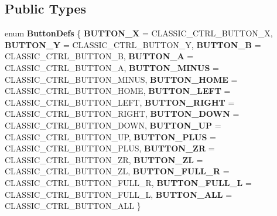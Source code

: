 \subsection*{\-Public \-Types}
\begin{DoxyCompactItemize}
\item 
enum {\bfseries \-Button\-Defs} \{ \*
{\bfseries \-B\-U\-T\-T\-O\-N\-\_\-\-X} =  \-C\-L\-A\-S\-S\-I\-C\-\_\-\-C\-T\-R\-L\-\_\-\-B\-U\-T\-T\-O\-N\-\_\-\-X, 
{\bfseries \-B\-U\-T\-T\-O\-N\-\_\-\-Y} =  \-C\-L\-A\-S\-S\-I\-C\-\_\-\-C\-T\-R\-L\-\_\-\-B\-U\-T\-T\-O\-N\-\_\-\-Y, 
{\bfseries \-B\-U\-T\-T\-O\-N\-\_\-\-B} =  \-C\-L\-A\-S\-S\-I\-C\-\_\-\-C\-T\-R\-L\-\_\-\-B\-U\-T\-T\-O\-N\-\_\-\-B, 
{\bfseries \-B\-U\-T\-T\-O\-N\-\_\-\-A} =  \-C\-L\-A\-S\-S\-I\-C\-\_\-\-C\-T\-R\-L\-\_\-\-B\-U\-T\-T\-O\-N\-\_\-\-A, 
\*
{\bfseries \-B\-U\-T\-T\-O\-N\-\_\-\-M\-I\-N\-U\-S} =  \-C\-L\-A\-S\-S\-I\-C\-\_\-\-C\-T\-R\-L\-\_\-\-B\-U\-T\-T\-O\-N\-\_\-\-M\-I\-N\-U\-S, 
{\bfseries \-B\-U\-T\-T\-O\-N\-\_\-\-H\-O\-M\-E} =  \-C\-L\-A\-S\-S\-I\-C\-\_\-\-C\-T\-R\-L\-\_\-\-B\-U\-T\-T\-O\-N\-\_\-\-H\-O\-M\-E, 
{\bfseries \-B\-U\-T\-T\-O\-N\-\_\-\-L\-E\-F\-T} =  \-C\-L\-A\-S\-S\-I\-C\-\_\-\-C\-T\-R\-L\-\_\-\-B\-U\-T\-T\-O\-N\-\_\-\-L\-E\-F\-T, 
{\bfseries \-B\-U\-T\-T\-O\-N\-\_\-\-R\-I\-G\-H\-T} =  \-C\-L\-A\-S\-S\-I\-C\-\_\-\-C\-T\-R\-L\-\_\-\-B\-U\-T\-T\-O\-N\-\_\-\-R\-I\-G\-H\-T, 
\*
{\bfseries \-B\-U\-T\-T\-O\-N\-\_\-\-D\-O\-W\-N} =  \-C\-L\-A\-S\-S\-I\-C\-\_\-\-C\-T\-R\-L\-\_\-\-B\-U\-T\-T\-O\-N\-\_\-\-D\-O\-W\-N, 
{\bfseries \-B\-U\-T\-T\-O\-N\-\_\-\-U\-P} =  \-C\-L\-A\-S\-S\-I\-C\-\_\-\-C\-T\-R\-L\-\_\-\-B\-U\-T\-T\-O\-N\-\_\-\-U\-P, 
{\bfseries \-B\-U\-T\-T\-O\-N\-\_\-\-P\-L\-U\-S} =  \-C\-L\-A\-S\-S\-I\-C\-\_\-\-C\-T\-R\-L\-\_\-\-B\-U\-T\-T\-O\-N\-\_\-\-P\-L\-U\-S, 
{\bfseries \-B\-U\-T\-T\-O\-N\-\_\-\-Z\-R} =  \-C\-L\-A\-S\-S\-I\-C\-\_\-\-C\-T\-R\-L\-\_\-\-B\-U\-T\-T\-O\-N\-\_\-\-Z\-R, 
\*
{\bfseries \-B\-U\-T\-T\-O\-N\-\_\-\-Z\-L} =  \-C\-L\-A\-S\-S\-I\-C\-\_\-\-C\-T\-R\-L\-\_\-\-B\-U\-T\-T\-O\-N\-\_\-\-Z\-L, 
{\bfseries \-B\-U\-T\-T\-O\-N\-\_\-\-F\-U\-L\-L\-\_\-\-R} =  \-C\-L\-A\-S\-S\-I\-C\-\_\-\-C\-T\-R\-L\-\_\-\-B\-U\-T\-T\-O\-N\-\_\-\-F\-U\-L\-L\-\_\-\-R, 
{\bfseries \-B\-U\-T\-T\-O\-N\-\_\-\-F\-U\-L\-L\-\_\-\-L} =  \-C\-L\-A\-S\-S\-I\-C\-\_\-\-C\-T\-R\-L\-\_\-\-B\-U\-T\-T\-O\-N\-\_\-\-F\-U\-L\-L\-\_\-\-L, 
{\bfseries \-B\-U\-T\-T\-O\-N\-\_\-\-A\-L\-L} =  \-C\-L\-A\-S\-S\-I\-C\-\_\-\-C\-T\-R\-L\-\_\-\-B\-U\-T\-T\-O\-N\-\_\-\-A\-L\-L
 \}
\end{DoxyCompactItemize}
